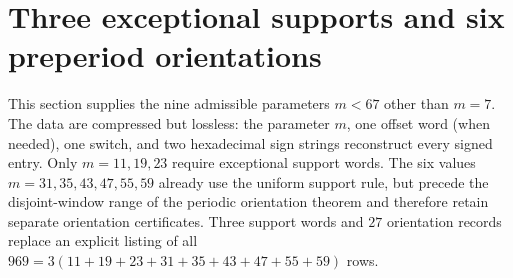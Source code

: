 \section{Three exceptional supports and six preperiod orientations}\label{sec:small-data}
This section supplies the nine admissible parameters $m<67$ other than $m=7$.
The data are compressed but lossless: the parameter $m$, one offset
word (when needed), one switch, and two hexadecimal sign strings reconstruct every signed entry.
Only $m=11,19,23$ require exceptional support words.  The six values
$m=31,35,43,47,55,59$ already use the uniform support rule, but precede the disjoint-window range of
the periodic orientation theorem and therefore retain separate orientation certificates.  Three
support words and $27$ orientation records replace an explicit listing of all
$969=3(11+19+23+31+35+43+47+55+59)$ rows.

